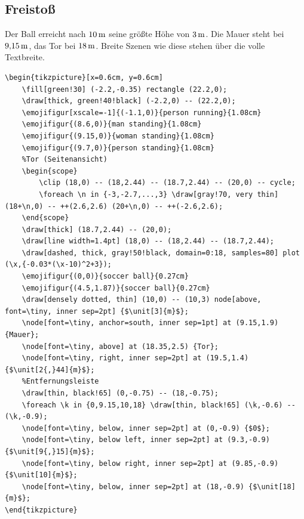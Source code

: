 \subsection{Freistoß}

Der Ball erreicht nach $\unit[10]{m}$ seine größte Höhe von $\unit[3]{m}$. Die Mauer steht bei $\unit[9{,}15]{m}$, das Tor bei $\unit[18]{m}$. Breite Szenen wie diese stehen über die volle Textbreite.

\begin{lstlisting}[style=latex]
\begin{tikzpicture}[x=0.6cm, y=0.6cm]
	\fill[green!30] (-2.2,-0.35) rectangle (22.2,0);
	\draw[thick, green!40!black] (-2.2,0) -- (22.2,0);
	\emojifigur[xscale=-1]{(-1.1,0)}{person running}{1.08cm}
	\emojifigur{(8.6,0)}{man standing}{1.08cm}
	\emojifigur{(9.15,0)}{woman standing}{1.08cm}
	\emojifigur{(9.7,0)}{person standing}{1.08cm}
	%Tor (Seitenansicht)
	\begin{scope}
		\clip (18,0) -- (18,2.44) -- (18.7,2.44) -- (20,0) -- cycle;
		\foreach \n in {-3,-2.7,...,3} \draw[gray!70, very thin] (18+\n,0) -- ++(2.6,2.6) (20+\n,0) -- ++(-2.6,2.6);
	\end{scope}
	\draw[thick] (18.7,2.44) -- (20,0);
	\draw[line width=1.4pt] (18,0) -- (18,2.44) -- (18.7,2.44);
	\draw[dashed, thick, gray!50!black, domain=0:18, samples=80] plot (\x,{-0.03*(\x-10)^2+3});
	\emojifigur{(0,0)}{soccer ball}{0.27cm}
	\emojifigur{(4.5,1.87)}{soccer ball}{0.27cm}
	\draw[densely dotted, thin] (10,0) -- (10,3) node[above, font=\tiny, inner sep=2pt] {$\unit[3]{m}$};
	\node[font=\tiny, anchor=south, inner sep=1pt] at (9.15,1.9) {Mauer};
	\node[font=\tiny, above] at (18.35,2.5) {Tor};
	\node[font=\tiny, right, inner sep=2pt] at (19.5,1.4) {$\unit[2{,}44]{m}$};
	%Entfernungsleiste
	\draw[thin, black!65] (0,-0.75) -- (18,-0.75);
	\foreach \k in {0,9.15,10,18} \draw[thin, black!65] (\k,-0.6) -- (\k,-0.9);
	\node[font=\tiny, below, inner sep=2pt] at (0,-0.9) {$0$};
	\node[font=\tiny, below left, inner sep=2pt] at (9.3,-0.9) {$\unit[9{,}15]{m}$};
	\node[font=\tiny, below right, inner sep=2pt] at (9.85,-0.9) {$\unit[10]{m}$};
	\node[font=\tiny, below, inner sep=2pt] at (18,-0.9) {$\unit[18]{m}$};
\end{tikzpicture}
\end{lstlisting}

